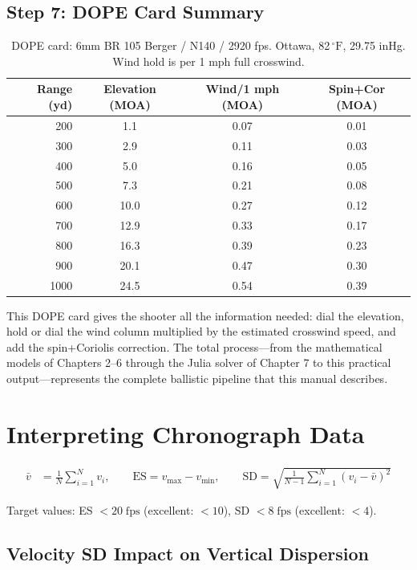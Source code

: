 \documentclass[11pt,twoside,openright]{report}
\newcommand{\degF}{{}^{\circ}\mathrm{F}}
\begin{document}
\subsection{Step 7: DOPE Card Summary}

\begin{table}[H]
\centering
\caption{DOPE card: 6mm BR 105 Berger / N140 / 2920 fps. Ottawa, 82$\,\degF$, 29.75 inHg. Wind hold is per 1 mph full crosswind.}
\label{tab:6br_dope}
\begin{tabular}{@{}rccc@{}}
\toprule
\textbf{Range (yd)} & \textbf{Elevation (MOA)} & \textbf{Wind/1 mph (MOA)} & \textbf{Spin+Cor (MOA)} \\
\midrule
200 &  1.1 & 0.07 & 0.01 \\
300 &  2.9 & 0.11 & 0.03 \\
400 &  5.0 & 0.16 & 0.05 \\
500 &  7.3 & 0.21 & 0.08 \\
600 & 10.0 & 0.27 & 0.12 \\
700 & 12.9 & 0.33 & 0.17 \\
800 & 16.3 & 0.39 & 0.23 \\
900 & 20.1 & 0.47 & 0.30 \\
1000 & 24.5 & 0.54 & 0.39 \\
\bottomrule
\end{tabular}
\end{table}

This DOPE card gives the shooter all the information needed: dial the elevation, hold or dial the wind column multiplied by the estimated crosswind speed, and add the spin+Coriolis correction. The total process---from the mathematical models of Chapters 2--6 through the Julia solver of Chapter 7 to this practical output---represents the complete ballistic pipeline that this manual describes.

\section{Interpreting Chronograph Data}

\begin{align}
  \bar{v} &= \frac{1}{N}\sum_{i=1}^N v_i, \qquad
  \text{ES} = v_{\max} - v_{\min}, \qquad
  \text{SD} = \sqrt{\frac{1}{N-1}\sum_{i=1}^N (v_i - \bar{v})^2}
\end{align}

Target values: ES $< 20\;\text{fps}$ (excellent: $< 10$), SD $< 8\;\text{fps}$ (excellent: $< 4$).

\subsection{Velocity SD Impact on Vertical Dispersion}
\end{document}
